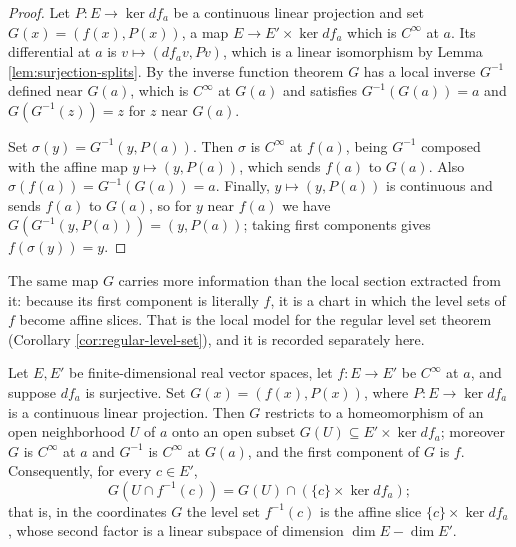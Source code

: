 \begin{proof}

Let $P : E \to \ker df_a$ be a continuous linear projection and set $G(x) = (f(x), P(x))$, a map $E \to E' \times \ker df_a$ which is $C^\infty$ at $a$. Its differential at $a$ is $v \mapsto (df_a v, Pv)$, which is a linear isomorphism by Lemma \ref{lem:surjection-splits}. By the inverse function theorem $G$ has a local inverse $G^{-1}$ defined near $G(a)$, which is $C^\infty$ at $G(a)$ and satisfies $G^{-1}(G(a)) = a$ and $G(G^{-1}(z)) = z$ for $z$ near $G(a)$.

Set $\sigma(y) = G^{-1}(y, P(a))$. Then $\sigma$ is $C^\infty$ at $f(a)$, being $G^{-1}$ composed with the affine map $y \mapsto (y, P(a))$, which sends $f(a)$ to $G(a)$. Also $\sigma(f(a)) = G^{-1}(G(a)) = a$. Finally, $y \mapsto (y, P(a))$ is continuous and sends $f(a)$ to $G(a)$, so for $y$ near $f(a)$ we have $G(G^{-1}(y, P(a))) = (y, P(a))$; taking first components gives $f(\sigma(y)) = y$.
\end{proof}

The same map $G$ carries more information than the local section extracted from it: because its first component is literally $f$, it is a chart in which the level sets of $f$ become affine slices. That is the local model for the regular level set theorem (Corollary \ref{cor:regular-level-set}), and it is recorded separately here.

\begin{proposition}
\label{prop:slice-chart-euclidean}





Let $E, E'$ be finite-dimensional real vector spaces, let $f : E \to E'$ be $C^\infty$ at $a$, and suppose $df_a$ is surjective. Set $G(x) = (f(x), P(x))$, where $P : E \to \ker df_a$ is a continuous linear projection. Then $G$ restricts to a homeomorphism of an open neighborhood $U$ of $a$ onto an open subset $G(U) \subseteq E' \times \ker df_a$; moreover $G$ is $C^\infty$ at $a$ and $G^{-1}$ is $C^\infty$ at $G(a)$, and the first component of $G$ is $f$. Consequently, for every $c \in E'$,
\[
G(U \cap f^{-1}(c)) = G(U) \cap \left(\{c\} \times \ker df_a\right);
\]
that is, in the coordinates $G$ the level set $f^{-1}(c)$ is the affine slice $\{c\} \times \ker df_a$, whose second factor is a linear subspace of dimension $\dim E - \dim E'$.
\end{proposition}

